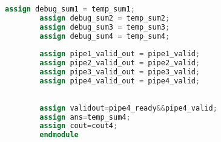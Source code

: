 \begin{lstlisting}[language=Verilog]
        assign debug_sum1 = temp_sum1;
        assign debug_sum2 = temp_sum2;
        assign debug_sum3 = temp_sum3;
        assign debug_sum4 = temp_sum4;
        
        assign pipe1_valid_out = pipe1_valid;
        assign pipe2_valid_out = pipe2_valid;
        assign pipe3_valid_out = pipe3_valid;
        assign pipe4_valid_out = pipe4_valid;
        
        
        assign validout=pipe4_ready&&pipe4_valid;
        assign ans=temp_sum4;
        assign cout=cout4;
        endmodule

\end{lstlisting}

